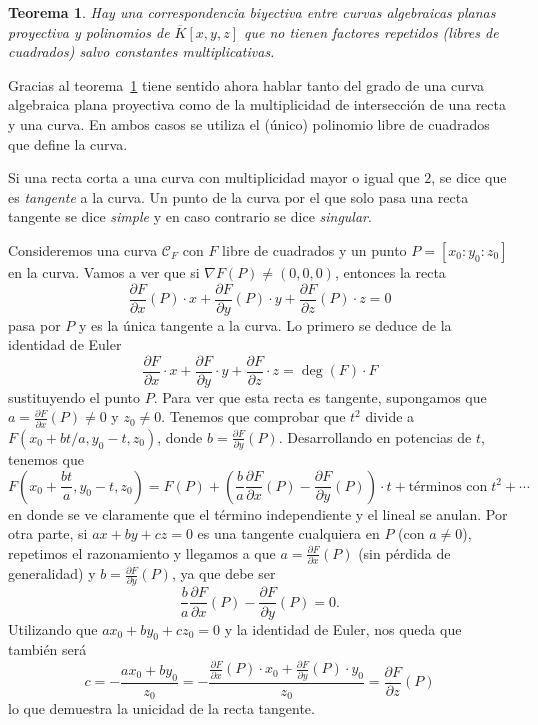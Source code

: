 \documentclass[a4paper, 11pt]{article}
\newcounter{numerodetema}
\theoremstyle{plain}
\newtheorem{teor}{Teorema}[numerodetema]
\theoremstyle{definition}
\begin{document}
\begin{teor}\label{teor-biyeccion}
Hay una correspondencia biyectiva entre curvas algebraicas planas proyectiva y
polinomios de $\overline{K}[x,y,z]$ que no tienen factores repetidos (libres de
cuadrados) salvo constantes multiplicativas.
\end{teor}

Gracias al teorema~\ref{teor-biyeccion} tiene sentido ahora hablar tanto del grado
de una curva algebraica plana proyectiva como de la multiplicidad de intersección
de una recta y una curva. En ambos casos se utiliza el (único) polinomio libre de
cuadrados que define la curva.

\bigskip

Si una recta corta a una curva con multiplicidad mayor o igual que $2$, se dice
que es \emph{tangente} a la curva. Un punto de la curva por el que solo pasa una
recta tangente se dice \emph{simple} y en caso contrario se dice \emph{singular}.

\bigskip

Consideremos una curva $\mathcal{C}_F$ con $F$ libre de cuadrados y un punto
$P=[x_0:y_0:z_0]$ en la curva. Vamos a ver que si $\nabla F(P)\neq (0,0,0)$,
entonces la recta
\[
  \frac{\partial F}{\partial x}(P)\cdot x +
  \frac{\partial F}{\partial y}(P)\cdot y +
  \frac{\partial F}{\partial z}(P)\cdot z = 0
\]
pasa por $P$ y es la única tangente a la curva. Lo primero se deduce de la identidad
de Euler
\[
  \frac{\partial F}{\partial x}\cdot x +
  \frac{\partial F}{\partial y}\cdot y +
  \frac{\partial F}{\partial z}\cdot z = \deg(F)\cdot F
\]
sustituyendo el punto $P$. Para ver que esta recta es tangente, supongamos que
$a=\frac{\partial F}{\partial x}(P)\neq 0$ y $z_0\neq 0$. Tenemos que comprobar
que $t^2$ divide a $F(x_0+bt/a, y_0-t, z_0)$, donde $b=\frac{\partial F}{\partial y}(P)$.
Desarrollando en potencias de $t$, tenemos que
\[
F\left(x_0+\frac{bt}a, y_0-t, z_0\right)=F(P)+\left(\frac{b}{a}\frac{\partial F}{\partial x}(P)-\frac{\partial F}{\partial y}(P)\right)\cdot t + \text{términos con}\;t^2 +\cdots
\]
en donde se ve claramente que el término independiente y el lineal se anulan. Por otra
parte, si $ax+by+cz=0$ es una tangente cualquiera en $P$ (con $a\neq 0$), repetimos el
razonamiento y llegamos a que $a=\frac{\partial F}{\partial x}(P)$ (sin pérdida de
generalidad) y $b=\frac{\partial F}{\partial y}(P)$, ya que debe ser
\[
\frac{b}{a}\frac{\partial F}{\partial x}(P)-\frac{\partial F}{\partial y}(P) = 0.
\]
Utilizando que $ax_0+by_0+cz_0=0$ y la identidad de Euler, nos queda que
también será
\[
  c = -\frac{ax_0+by_0}{z_0} = -\frac{\frac{\partial F}{\partial x}(P)\cdot x_0 +
  \frac{\partial F}{\partial y}(P)\cdot y_0}{z_0} = \frac{\partial F}{\partial z}(P)
\]
lo que demuestra la unicidad de la recta tangente.
\end{document}
